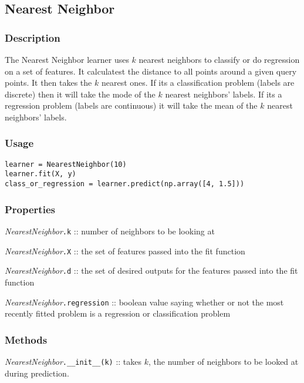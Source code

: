 \documentclass{article}
\begin{document}
\subsection{Nearest Neighbor}

\subsubsection{Description}

The Nearest Neighbor learner uses $k$ nearest neighbors to classify or do
regression on a set of features. It calculatest the distance to all points
around a given query points. It then takes the $k$ nearest ones. If its a
classification problem (labels are discrete) then it will take the mode of the
$k$ nearest neighbors' labels. If its a regression problem (labels are
continuous) it will take the mean of the $k$ nearest neighbors' labels.
\subsubsection{Usage}

\begin{verbatim}
learner = NearestNeighbor(10)
learner.fit(X, y)
class_or_regression = learner.predict(np.array([4, 1.5]))
\end{verbatim}

\subsubsection{Properties}

\textit{NearestNeighbor}\texttt{.k} :: number of neighbors to be looking at

\textit{NearestNeighbor}\texttt{.X} :: the set of features passed into the fit
function

\textit{NearestNeighbor}\texttt{.d} :: the set of desired outputs for the
features passed into the fit function

\textit{NearestNeighbor}\texttt{.regression} :: boolean value saying whether or
not the most recently fitted problem is a regression or classification problem

\subsubsection{Methods}

\textit{NearestNeighbor}\texttt{.\_\_init\_\_(k)} :: takes $k$, the number of
neighbors to be looked at during prediction.
\end{document}
